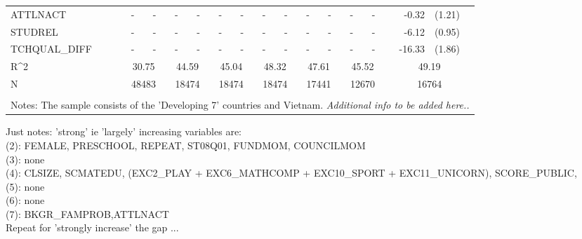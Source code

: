 \documentclass[12pt]{article}%
\begin{document}
\begin{table}[H]
\begin{tabular}{lrlrlrlrlrlrlrl}
			ATTLNACT & \multicolumn{1}{c}{-} & \multicolumn{1}{c}{-} & \multicolumn{1}{c}{-} & \multicolumn{1}{c}{-} & \multicolumn{1}{c}{-} & \multicolumn{1}{c}{-} & \multicolumn{1}{c}{-} & \multicolumn{1}{c}{-} & \multicolumn{1}{c}{-} & \multicolumn{1}{c}{-} & \multicolumn{1}{c}{-} & \multicolumn{1}{c}{-} & -0.32 & (1.21) \\[0.2em]
			STUDREL & \multicolumn{1}{c}{-} & \multicolumn{1}{c}{-} & \multicolumn{1}{c}{-} & \multicolumn{1}{c}{-} & \multicolumn{1}{c}{-} & \multicolumn{1}{c}{-} & \multicolumn{1}{c}{-} & \multicolumn{1}{c}{-} & \multicolumn{1}{c}{-} & \multicolumn{1}{c}{-} & \multicolumn{1}{c}{-} & \multicolumn{1}{c}{-} & -6.12 & (0.95) \\[0.2em]
			TCHQUAL\_DIFF & \multicolumn{1}{c}{-} & \multicolumn{1}{c}{-} & \multicolumn{1}{c}{-} & \multicolumn{1}{c}{-} & \multicolumn{1}{c}{-} & \multicolumn{1}{c}{-} & \multicolumn{1}{c}{-} & \multicolumn{1}{c}{-} & \multicolumn{1}{c}{-} & \multicolumn{1}{c}{-} & \multicolumn{1}{c}{-} & \multicolumn{1}{c}{-} & -16.33 & (1.86) \\[0.2em]
			
			R^{2}   & \multicolumn{2}{c}{30.75} & \multicolumn{2}{c}{44.59} & \multicolumn{2}{c}{45.04} & \multicolumn{2}{c}{48.32} & \multicolumn{2}{c}{47.61} & \multicolumn{2}{c}{45.52} & \multicolumn{2}{c}{49.19} \\
			N     & \multicolumn{2}{c}{48483} & \multicolumn{2}{c}{18474} & \multicolumn{2}{c}{18474} & \multicolumn{2}{c}{18474} & \multicolumn{2}{c}{17441} & \multicolumn{2}{c}{12670} & \multicolumn{2}{c}{16764} \\
			
			\bottomrule
			\\
			\multicolumn{15}{l}{Notes: The sample consists of the 'Developing 7' countries and Vietnam. \textit{Additional info to be added here..}}\\
			
		\end{tabular}%
		\label{tab:addlabel}%
	\end{table}%

Just notes: 'strong' ie 'largely' increasing variables are:\\
(2): FEMALE, PRESCHOOL, REPEAT, ST08Q01, FUNDMOM, COUNCILMOM\\
(3): none \\
(4): CLSIZE, SCMATEDU, (EXC2\_PLAY + EXC6\_MATHCOMP + EXC10\_SPORT + EXC11\_UNICORN), SCORE\_PUBLIC, \\
(5): none \\
(6): none \\
(7): BKGR\_FAMPROB,ATTLNACT \\
Repeat for 'strongly increase' the gap ...
\end{document}
